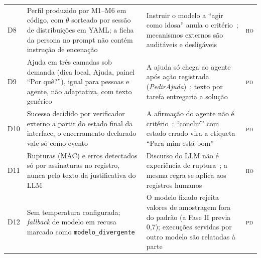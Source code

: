 \documentclass[conference]{IEEEtran}
\newcommand{\stPD}{\textsc{pd}}
\newcommand{\stHO}{\textsc{ho}}
\begin{document}
\begin{table}[!t]
\begin{tabularx}{\textwidth}{@{}P{0.5cm}P{4.6cm}YP{0.8cm}@{}}
D8 & Perfil produzido por M1--M6 em código, com $\theta$ sorteado por sessão de distribuições em YAML; a ficha da persona no prompt não contém instrução de encenação & Instruir o modelo a ``agir como idosa'' anula o critério~\cite{lara2026p3}; mecanismos externos são auditáveis e desligáveis~\cite{laviola2017} & \stHO \\
D9 & Ajuda em três camadas sob demanda (dica local, Ajuda, painel ``Por quê?''), igual para pessoas e agente, não adaptativa, com texto genérico & A ajuda só chega ao agente após ação registrada (\textit{PedirAjuda})~\cite{shneiderman2018}; texto por tarefa entregaria a solução & \stPD \\
D10 & Sucesso decidido por verificador externo a partir do estado final da interface; o encerramento declarado vale só como evento & A afirmação do agente não é critério~\cite{lara2026p3}; ``concluí'' com estado errado vira a etiqueta ``Para mim está bom'' & \stPD \\
D11 & Rupturas (MAC) e erros detectados só por assinaturas no registro, nunca pelo texto da justificativa do LLM & Discurso do LLM não é experiência de ruptura~\cite{nielsen2010}; a mesma regra se aplica aos registros humanos & \stHO \\
D12 & Sem temperatura configurada; \textit{fallback} de modelo em recusa marcado como \texttt{modelo\_divergente} & O modelo fixado rejeita valores de amostragem fora do padrão (a Fase II previa 0,7); execuções servidas por outro modelo são relatadas à parte & \stPD \\
\bottomrule
\end{tabularx}
\end{table}

\end{document}
